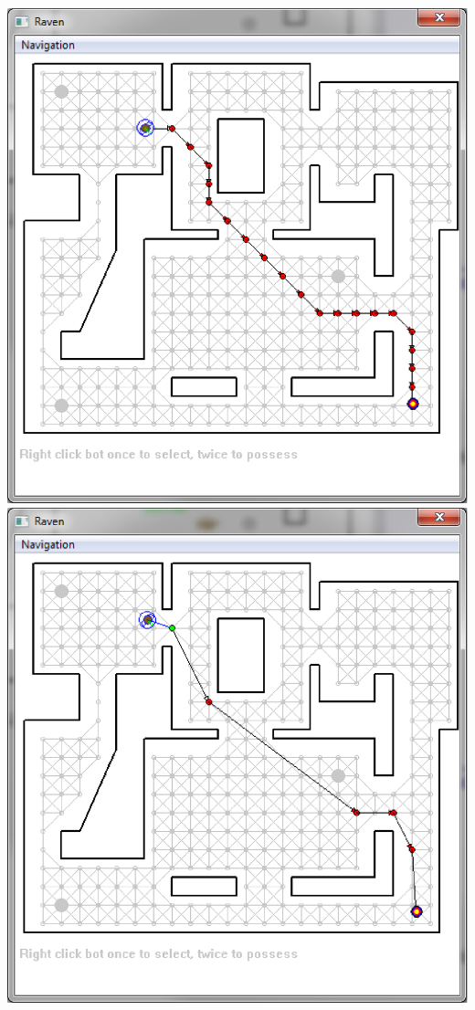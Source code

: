 \documentclass[t,compress]{beamer}
\begin{document}
\includegraphics[scale=0.33]{unsmoothedpath.eps}
\includegraphics[scale=0.33]{smoothedpath.eps}
\end{document}
